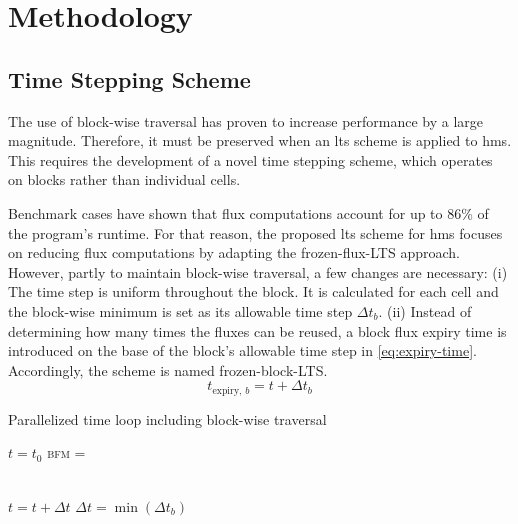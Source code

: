 \section{Methodology}\label{sec:methods}

\subsection{Time Stepping Scheme}\label{sec:time-step-scheme}

The use of block-wise traversal has proven to increase performance by a large magnitude. 
Therefore, it must be preserved when an \gls{lts} scheme is applied to \gls{hms}. This requires
the development of a novel time stepping scheme, which operates on blocks rather than individual cells.

\label{fix:flux-cost-share}
Benchmark cases have shown that flux computations account for up to 86\% 
of the program's runtime.
For that reason, the proposed \gls{lts} scheme for \gls{hms} focuses on reducing flux computations by adapting the \gls{frozen-flux-LTS} approach.
However, partly to maintain block-wise traversal, a few changes are necessary:
(i) The time step is uniform throughout the block. It is calculated for each cell and the block-wise minimum is set as its allowable time step $\Delta t_b$.
(ii) Instead of determining how many times the fluxes can be reused, a block flux expiry time is introduced on the base of the block's allowable time step in \autoref{eq:expiry-time}.
Accordingly, the scheme is named \gls{frozen-block-LTS}.
\begin{equation}
  \label{eq:expiry-time}
  t_{\text{expiry}, \, b} = t + \Delta t_b
\end{equation}


\begin{algorithm} [b]
  \caption{Parallelized time loop including block-wise traversal}
  \label{alg:bi_loop}
  \begin{algorithmic}[1]
    \small

    \State $t = t_0$ 
    \State {}
    \State \textsc{bfm} = 

       
        \\ {\color{white}} \; \;
      \EndFor
      \State $t = t + \Delta t$ 
      \State $\Delta t = \min(\Delta t_{b})$ 
    \EndWhile
  \end{algorithmic}
\end{algorithm}

